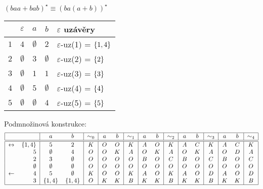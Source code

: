\begin{multicols}{2}
    $(baa + bab)^\star \equiv (ba(a+b))^\star$


\columnbreak

    \begin{tabular}{|r|c c c|l|}
        \hline
        & $\varepsilon$ & $a$ & $b$ & $\varepsilon$ uzávěry\\
        \hline
        \hline
        $1$ & $4$ & $\emptyset$ & $2$         & $\varepsilon$-uz(1) = $\left\lbrace 1,4 \right\rbrace$\\
        $2$ & $\emptyset$ & $3$ & $\emptyset$ & $\varepsilon$-uz(2) = $\left\lbrace 2 \right\rbrace$\\
        $3$ & $\emptyset$ & $1$ & $1$         & $\varepsilon$-uz(3) = $\left\lbrace 3 \right\rbrace$\\
        $4$ & $\emptyset$ & $5$ & $\emptyset$ & $\varepsilon$-uz(4) = $\left\lbrace 4 \right\rbrace$\\
        $5$ & $\emptyset$ & $\emptyset$ & $4$ & $\varepsilon$-uz(5) = $\left\lbrace 5 \right\rbrace$\\
        \hline
    \end{tabular}
\end{multicols}
Podmnožinová konstrukce:
\[
\begin{tabular}{|r r|c c|c|c c|c|c c|c|c c|c|c c|c|}
    \hline
    & & $a$ & $b$ & $\sim_0$ & $a$ & $b$ & $\sim_1$ & $a$ & $b$ & $\sim_2$ & $a$ & $b$ & $\sim_3$ & $a$ & $b$ & $\sim_4$ \\ \hline \hline
    $\leftrightarrow$& $\bc{1,4}$&$5$         &$2$         &$K$ &$O$ &$O$ &$K$ &$A$ &$O$ &$K$ &$A$ &$C$ &$K$ &$A$ &$C$ &$K$ \\
    $$&             $5$          &$\emptyset$ &$4$         &$O$ &$O$ &$K$ &$A$ &$O$ &$K$ &$A$ &$O$ &$K$ &$A$ &$O$ &$D$ &$A$ \\
    $$&             $2$          &$3$         &$\emptyset$ &$O$ &$O$ &$O$ &$O$ &$B$ &$O$ &$C$ &$B$ &$O$ &$C$ &$B$ &$O$ &$C$ \\
    $$&             $\emptyset$  &$\emptyset$ &$\emptyset$ &$O$ &$O$ &$O$ &$O$ &$O$ &$O$ &$O$ &$O$ &$O$ &$O$ &$O$ &$O$ &$O$ \\
    $\leftarrow $&  $4$          &$5$         &$\emptyset$ &$K$ &$O$ &$O$ &$K$ &$A$ &$O$ &$K$ &$A$ &$O$ &$D$ &$A$ &$O$ &$D$ \\
    $$&             $3$          &$\bc{1,4}$  &$\bc{1,4}$  &$O$ &$K$ &$K$ &$B$ &$K$ &$K$ &$B$ &$K$ &$K$ &$B$ &$K$ &$K$ &$B$ \\
    \hline
\end{tabular}
\]
